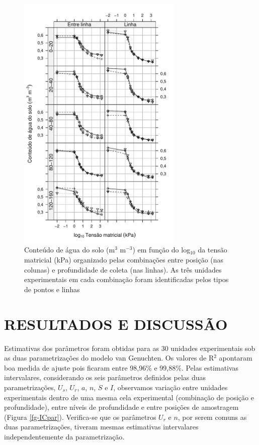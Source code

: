 \begin{figure}[!ht]
 \begin{center}
 \includegraphics[width=0.7\textwidth]{../figuras/cra_perfil.pdf}
\end{center}
 \caption{Conteúdo de água do solo (m$^3$ m$^{-3}$) em função do
   log$_{10}$ da tensão matricial (kPa) organizado pelas combinações
   entre posição (nas colunas) e profundidade de coleta (nas linhas).
   As três unidades experimentais em cada combinação foram
   identificadas pelos tipos de pontos e linhas}
 \label{fg-craperfil}
\end{figure}

\newpage
\section{RESULTADOS E DISCUSSÃO}\label{sc-results}

Estimativas dos parâmetros foram obtidas para as 30 unidades
experimentais sob as duas parametrizações do modelo van Genuchten.  Os
valores de R$^2$ apontaram boa medida de ajuste pois ficaram entre
98,96\% e 99,88\%.  Pelas estimativas intervalares, considerando os
seis parâmetros definidos pelas duas parametrizações, $U_s$, $U_r$,
$a$, $n$, $S$ e $I$, observamos variação entre unidades experimentais
dentro de uma mesma cela experimental (combinação de posição e
profundidade), entre níveis de profundidade e entre posições de
amostragem (Figura \ref{fg-ICpar}).  Verifica-se que os parâmetros
$U_r$ e $n$, por serem comuns as duas parametrizações, tiveram mesmas
estimativas intervalares independentemente da parametrização.

